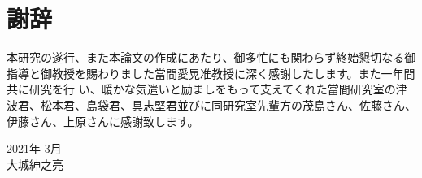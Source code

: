 \chapter*{謝辞}
\thispagestyle{empty}


\hspace{1zw}
本研究の遂行、また本論文の作成にあたり、御多忙にも関わらず終始懇切なる御指導と御教授を賜わりました當間愛晃准教授に深く感謝したします。また一年間共に研究を行 い、暖かな気遣いと励ましをもって支えてくれた當間研究室の津波君、松本君、島袋君、具志堅君並びに同研究室先輩方の茂島さん、佐藤さん、伊藤さん、上原さんに感謝致します。

\begin{flushright}
 2021年 3月 \\ 大城紳之亮
\end{flushright}


